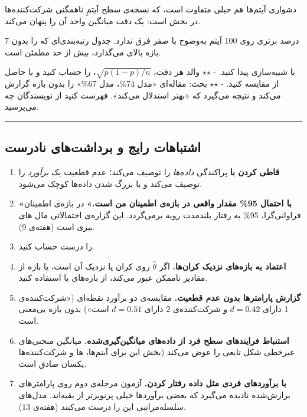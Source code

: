 دشواری آیتم‌ها هم خیلی متفاوت است، که نسخه‌ی سطح آیتمِ ناهمگنی شرکت‌کننده‌ها
در بخش  است: یک دقت میانگین واحد آن را پنهان می‌کند.

7 درصد برتری روی 100 آیتم به‌وضوح با صفر فرق ندارد. جدول رتبه‌بندی‌ای که
 را بدون بازه بالای  می‌گذارد، بیش از حد مطمئن است.

با شبیه‌سازی پیدا کنید. - \ensuremath{\star}\ensuremath{\star}  والد  هر دقت،
\(\sqrt{p(1-p)/n}\)، را حساب کنید و با  حاصل از 
مقایسه کنید. - \ensuremath{\star}\ensuremath{\star} بحث: مقاله‌ای «مدل  74\%، مدل  67\%» را
بدون بازه گزارش می‌کند و نتیجه می‌گیرد که  «بهتر استدلال می‌کند».
فهرست کنید از نویسندگان چه می‌پرسید.

\begin{center}\rule{0.5\linewidth}{0.5pt}\end{center}

\subsection{اشتباهات رایج و برداشت‌های نادرست}

\begin{enumerate}
\def\labelenumi{\arabic{enumi}.}
\tightlist
\item
  \textbf{قاطی کردن  با }  پراکندگی \emph{داده‌ها}
  را توصیف می‌کند؛  عدم قطعیت یک \emph{برآورد} را توصیف می‌کند و با
  بزرگ شدن داده‌ها کوچک می‌شود.
\item
  \textbf{«با احتمال 95\% مقدار واقعی در بازه‌ی اطمینان من است.»} در
  بازه‌ی اطمینان فراوانی‌گرا، 95\% به رفتار بلندمدت رویه برمی‌گردد. این
  گزاره‌ی احتمالاتی مال های بیزی است (هفته‌ی 9).
\item
   را درست حساب کنید.
\item
  \textbf{اعتماد به بازه‌های  نزدیک کران‌ها.} اگر \(\hat\theta\)
  روی کران یا نزدیک آن است، یا بازه از مقادیر ناممکن عبور می‌کند، از
  بازه‌های  یا  استفاده کنید.
\item
  \textbf{گزارش پارامترها بدون عدم قطعیت.} مقایسه‌ی دو برآورد نقطه‌ای
  («شرکت‌کننده‌ی 1 دارای \(d = 0.42\) و شرکت‌کننده‌ی 2 دارای \(d = 0.51\)
  است») بدون بازه بی‌معنی است.
\item
  \textbf{استنباط فرایندهای سطح فرد از داده‌های میانگین‌گیری‌شده.} میانگین
  منحنی‌های غیرخطی شکل تابعی را عوض می‌کند (بخش  این برای آیتم‌ها،
  ها و شرکت‌کننده‌ها یکسان صادق است.
\item
  \textbf{با برآوردهای فردی مثل داده رفتار کردن.} آزمون  مرحله‌ی
  دوم روی پارامترهای برازش‌شده نادیده می‌گیرد که بعضی برآوردها خیلی
  پرنویزتر از بقیه‌اند. مدل‌های سلسله‌مراتبی این را درست می‌کنند (هفته‌ی 13).
\end{enumerate}

